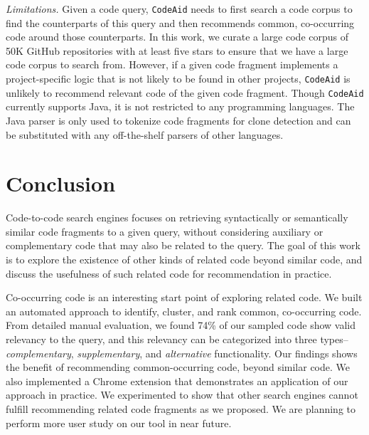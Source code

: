 \documentclass[conference]{IEEEtran}
\newcommand{\ttt}[1]{\tt\small{#1}}
\newcommand{\tool}{{\ttt CodeAid}}
\begin{document}
{\em Limitations.} Given a code query, {\tool} needs to first search a code corpus to find the counterparts of this query and then recommends common, co-occurring code around those counterparts. In this work, we curate a large code corpus of 50K GitHub repositories with at least five stars to ensure that we have a large code corpus to search from. However, if a given code fragment  implements a project-specific logic that is not likely to be found in other projects, {\tool} is unlikely to recommend relevant code of the given code fragment. Though {\tool} currently supports Java, it is not restricted to any programming languages. The Java parser is only used to tokenize code fragments for clone detection and can be substituted with any off-the-shelf parsers of other languages.


\section{Conclusion}
\label{sec:conclude}

Code-to-code search engines focuses on retrieving syntactically or semantically similar code fragments to a given query, without considering auxiliary or complementary code that may also be related to the query. The goal of this work is to explore the existence of other kinds of related code beyond similar code, and discuss the usefulness of such related code for recommendation in practice.

Co-occurring code is an interesting start point of exploring related code. We built an automated approach to identify, cluster, and rank common, co-occurring code. From detailed manual evaluation, we found 74\% of our sampled code show valid relevancy to the query, and this relevancy can be categorized into three types--{\em complementary}, {\em supplementary}, and {\em alternative} functionality. Our findings shows the benefit of recommending common-occurring code, beyond similar code. We also implemented a Chrome extension that demonstrates an application of our approach in practice. We experimented to show that other search engines cannot fulfill recommending related code fragments as we proposed. We are planning to perform more user study on our tool in near future.








\end{document}
